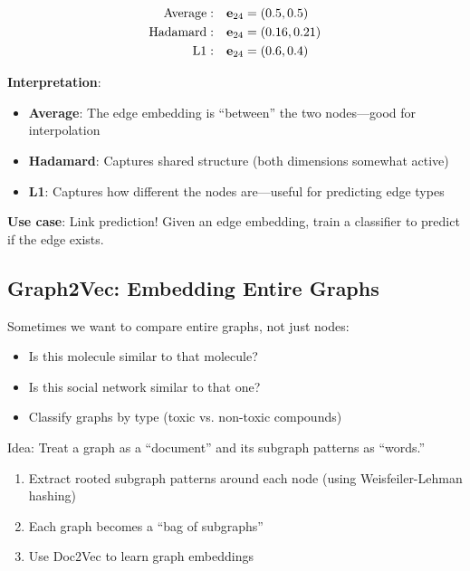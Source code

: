 \begin{notechapter}
\begin{example}
\begin{align*}
\text{Average}: & \quad \mathbf{e}_{24} = (0.5, 0.5) \\
\text{Hadamard}: & \quad \mathbf{e}_{24} = (0.16, 0.21) \\
\text{L1}: & \quad \mathbf{e}_{24} = (0.6, 0.4)
\end{align*}

\textbf{Interpretation}:
\begin{itemize}
    \item \textbf{Average}: The edge embedding is ``between'' the two nodes---good for interpolation
    \item \textbf{Hadamard}: Captures shared structure (both dimensions somewhat active)
    \item \textbf{L1}: Captures how different the nodes are---useful for predicting edge types
\end{itemize}
\end{example}

\textbf{Use case}: Link prediction! Given an edge embedding, train a classifier to predict if the edge exists.

\subsection{Graph2Vec: Embedding Entire Graphs}

\begin{whybox}
Sometimes we want to compare entire graphs, not just nodes:
\begin{itemize}
    \item Is this molecule similar to that molecule?
    \item Is this social network similar to that one?
    \item Classify graphs by type (toxic vs. non-toxic compounds)
\end{itemize}
\end{whybox}

\begin{definition}
Idea: Treat a graph as a ``document'' and its subgraph patterns as ``words.''
\begin{enumerate}
    \item Extract rooted subgraph patterns around each node (using Weisfeiler-Lehman hashing)
    \item Each graph becomes a ``bag of subgraphs''
    \item Use Doc2Vec to learn graph embeddings
\end{enumerate}
\end{definition}


\end{notechapter}
